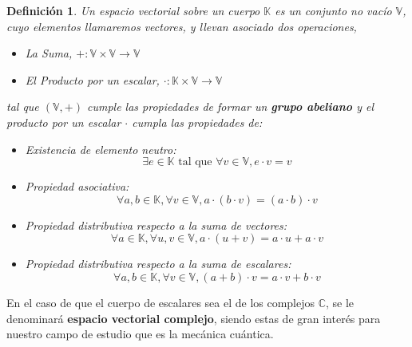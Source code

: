 \documentclass[a4paper]{article}
\newtheorem{deff}{Definición}[section]
\numberwithin{equation}{section}
\begin{document}
\begin{deff}

Un espacio vectorial sobre un cuerpo $\mathbb{K}$ es un conjunto no vacío $\mathbb{V}$, cuyo elementos llamaremos vectores, y llevan asociado dos operaciones, 
\begin{itemize}

\item La Suma, $\textbf{+}: \mathbb{V} \times \mathbb{V} \longrightarrow \mathbb{V}$

\item El Producto por un escalar, $\textbf{$\cdot$}:\mathbb{K} \times \mathbb{V} \longrightarrow \mathbb{V}$

\end{itemize}
tal que $(\mathbb{V},+)$ cumple las propiedades de formar un \textbf{grupo abeliano} y el producto por un escalar $\cdot$ cumpla las propiedades de:
\begin{itemize}

\item Existencia de elemento neutro:
\begin{equation}
\exists e \in \mathbb{K} \text{ tal que } \forall v \in \mathbb{V},  e \cdot v = v
\end{equation}

\item Propiedad asociativa:
\begin{equation}
\forall a, b \in \mathbb{K}, \forall v \in \mathbb{V}, a\cdot(b\cdot v) = (a\cdot b)\cdot v
\end{equation}

\item Propiedad distributiva respecto a la suma de vectores:
\begin{equation}
\forall a \in \mathbb{K}, \forall u, v \in \mathbb{V}, a\cdot(u + v) = a\cdot u + a\cdot v
\end{equation}

\item Propiedad distributiva respecto a la suma de escalares:
\begin{equation}
\forall a, b \in \mathbb{K}, \forall v \in \mathbb{V}, (a + b)\cdot v = a\cdot v + b\cdot v
\end{equation}

\end{itemize}

\end{deff}

En el caso de que el cuerpo de escalares sea el de los complejos $\mathbb{C}$, se le denominará \textbf{espacio vectorial complejo}, siendo estas de gran interés para nuestro campo de estudio que es la mecánica cuántica.
\end{document}
